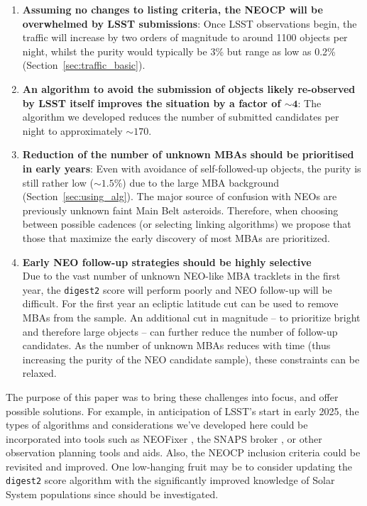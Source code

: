 \documentclass[twocolumn]{aastex631}
\newcommand{\dig}{\texttt{digest2}}
\newcommand{\npernightAlg}{170}
\newcommand{\purityAlg}{1.5}
\begin{document}
\begin{enumerate}
    \item \textbf{Assuming no changes to listing criteria, the NEOCP will be overwhelmed by LSST submissions}: Once LSST observations begin, the traffic will increase by two orders of magnitude to around 1100 objects per night, whilst the purity would typically be 3\% but range as low as 0.2\% (Section~\ref{sec:traffic_basic}).
    \item \textbf{An algorithm to avoid the submission of objects likely re-observed by LSST itself improves the situation by a factor of $\mathbf{\sim4}$}: The algorithm we developed reduces the number of submitted candidates per night to approximately ${\sim}\npernightAlg{}$.
    \item \textbf{Reduction of the number of unknown MBAs should be prioritised in early years}: Even with avoidance of self-followed-up objects, the purity is still rather low (${\sim}\purityAlg{}\%$) due to the large MBA background (Section~\ref{sec:using_alg}).
    The major source of confusion with NEOs are previously unknown faint Main Belt asteroids. Therefore, when choosing between possible cadences (or selecting linking algorithms) we propose that those that maximize the early discovery of most MBAs are prioritized.
    \item \textbf{Early NEO follow-up strategies should be highly selective}\\Due to the vast number of unknown NEO-like MBA tracklets in the first year, the \dig{} score will perform poorly and NEO follow-up will be difficult. For the first year an ecliptic latitude cut can be used to remove MBAs from the sample. An additional cut in magnitude -- to prioritize bright and therefore large objects -- can further reduce the number of follow-up candidates. As the number of unknown MBAs reduces with time (thus increasing the purity of the NEO candidate sample), these constraints can be relaxed.
\end{enumerate}

The purpose of this paper was to bring these challenges into focus, and offer possible solutions. For example, in anticipation of LSST's start in early 2025, the types of algorithms and considerations we've developed here could be incorporated into tools such as NEOFixer \citep{NEOfixer}, the SNAPS broker \citep{SNAPS}, or other observation planning tools and aids. Also, the NEOCP inclusion criteria could be revisited and improved. One low-hanging fruit may be to consider updating the \dig{} score algorithm with the significantly improved knowledge of Solar System populations since \citet{Keys+2019} should be investigated.
\\
\end{document}
